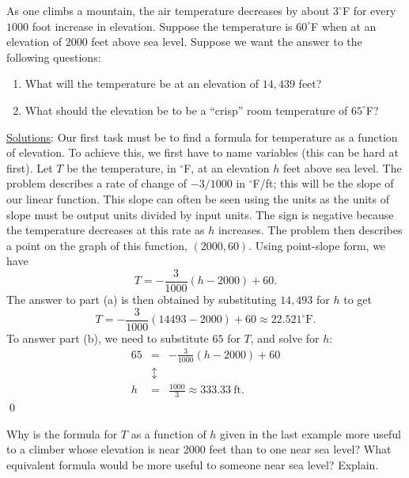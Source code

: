 \begin{eg} As one climbs a mountain, the air temperature decreases by about $3^{\circ}$F for every $1000$ foot increase in elevation. Suppose the temperature is $60^{\circ}$F when at an elevation of $2000$ feet above sea level. Suppose we want the answer to the following questions:
\begin{enumerate}
\item What will the temperature be at an elevation of $14,439$ feet?
\item What should the elevation be to be a ``crisp'' room temperature of $65^{\circ}$F?
\end{enumerate}
\underline{Solutions}\normalfont: Our first task must be to find a formula for temperature as a function of elevation. To achieve this, we first have to name variables (this can be hard at first). Let $T$ be the temperature, in $^{\circ}$F, at an elevation $h$ feet above sea level. The problem describes a rate of change of $-3/1000$ in $^{\circ}$F/ft; this will be the slope of our linear function. This slope can often be seen using the units as the units of slope must be output units divided by input units. The sign is negative because the temperature decreases at this rate as $h$ increases. The problem then describes a point on the graph of this function, $(2000,60)$. Using point-slope form, we have
\[
T = -\frac{3}{1000}(h-2000) + 60.
\]
The answer to part (a) is then obtained by substituting $14,493$ for $h$ to get 
\[
T = -\frac{3}{1000}(14493-2000) + 60\approx 22.521^{\circ}\mbox{F}.
\]
To answer part (b), we need to substitute $65$ for $T$, and solve for $h$:
\begin{eqnarray*}
65 & = & -\frac{3}{1000}(h-2000) + 60\\
 & \updownarrow & \\
h & = & \frac{1000}{3}\approx 333.33\ \mbox{ft}.
\end{eqnarray*}\qed \end{eg}

\par    

\begin{question} Why is the formula for $T$ as a function of $h$ given in the last example more useful to a climber whose elevation is near 2000 feet than to one near sea level? What equivalent formula would be more useful to someone near sea level? Explain.
\end{question}

\par

